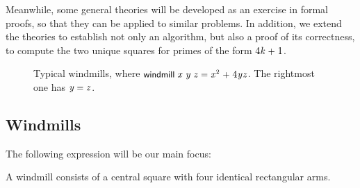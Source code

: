 \documentclass[sigplan,screen]{acmart}
\renewcommand{\HOLinline}[1]{\ensuremath{#1}} %
\renewcommand{\HOLConst}[1]{{\fontsize{9pt}{1em}\selectfont\textsf{\upshape #1}}}
\renewcommand{\HOLNumLit}[1]{{\selectfont\textrm{\upshape #1}}} %
\renewcommand{\HOLSymConst}[1]{{\fontsize{9pt}{1em}\selectfont\textsf{\upshape #1}}}
\newcommand{\windmill}[5]
{
\draw[fill=blue!30!white] %
     (#1,#2+#3) -- (#1,#2+#3+#5) -- (#1+#4,#2+#3+#5) -- (#1+#4,#2+#3)  -- (#1,#2+#3);
\draw[fill=blue!30!white] %
     (#1+#3,#2+#3) -- (#1+#3,#2+#3-#4) -- (#1+#3+#5,#2+#3-#4) -- (#1+#3+#5,#2+#3) -- (#1+#3,#2+#3);
\draw[fill=blue!30!white] %
     (#1+#3,#2) -- (#1+#3,#2-#5) -- (#1+#3-#4,#2-#5) -- (#1+#3-#4,#2)  -- (#1+#3,#2);
\draw[fill=blue!30!white] %
     (#1,#2) -- (#1,#2+#4) -- (#1-#5,#2+#4) -- (#1-#5,#2) -- (#1,#2);
\draw[fill=pink!40!white] %
     (#1,#2) -- (#1,#2+#3) -- (#1+#3,#2+#3) -- (#1+#3,#2) -- (#1,#2);
}
\begin{document}
Meanwhile, some general theories will be developed as an exercise in formal proofs, so that they can be applied to similar problems.
In addition, we extend the theories to establish not only an algorithm, but also a proof of its correctness, to compute the two unique squares for primes of the form \HOLinline{\HOLNumLit{4}\HOLSymConst{\ensuremath{}}\HOLFreeVar{k}\;\HOLSymConst{\ensuremath{+}}\;\HOLNumLit{1}}.


\begin{figure}[h]  %
\begin{center}
\caption{Typical windmills, where \HOLinline{\HOLConst{windmill}\;\HOLFreeVar{x}\;\HOLFreeVar{y}\;\HOLFreeVar{z}\;\HOLSymConst{=}\;\HOLFreeVar{x}\HOLSymConst{\ensuremath{\sp{2}}}\;\HOLSymConst{\ensuremath{+}}\;\HOLNumLit{4}\HOLSymConst{\ensuremath{}}\HOLFreeVar{y}\HOLSymConst{\ensuremath{}}\HOLFreeVar{z}}. The rightmost one has \HOLinline{\HOLFreeVar{y}\;\HOLSymConst{=}\;\HOLFreeVar{z}}.}
\label{fig:windmill-sample} %
\end{center}
\end{figure}

\subsection{Windmills}
\label{sec:windmills}
The following expression will be our main focus:
\begin{definition}
\label{def:windmill-def}
A windmill consists of a central square with four identical rectangular arms.
\begin{HOLmath}
\;\;\HOLConst{windmill}\;\;\;\;\HOLTokenDefEquality{}\;\HOLFreeVar{x}\HOLSymConst{\ensuremath{\sp{2}}}\;\HOLSymConst{\ensuremath{+}}\;\HOLNumLit{4}\HOLSymConst{\ensuremath{}}\HOLFreeVar{y}\HOLSymConst{\ensuremath{}}
\end{HOLmath}
\end{definition}
\end{document}
